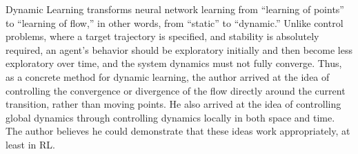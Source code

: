 Dynamic Learning transforms neural network learning from ``learning of points'' to ``learning of flow,'' in other words,
from ``static'' to ``dynamic.''
Unlike control problems, where a target trajectory is specified, and stability is absolutely required,
an agent's behavior should be exploratory initially and then become less exploratory over time,
and the system dynamics must not fully converge.
Thus, as a concrete method for dynamic learning,
the author arrived at the idea of controlling the convergence or divergence of the flow directly
around the current transition, rather than moving points.
He also arrived at the idea of controlling global dynamics through controlling dynamics locally in both space and time.
The author believes he could demonstrate that these ideas work appropriately, at least in RL.

